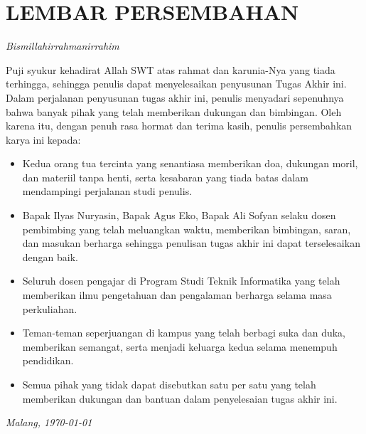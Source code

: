  {}
\chapter*{\uppercase{LEMBAR PERSEMBAHAN}}
\vspace{1cm}


\begin{center}
    \large\textit{Bismillahirrahmanirrahim}
\end{center}

\vspace{1cm}

Puji syukur kehadirat Allah SWT atas rahmat dan karunia-Nya yang tiada terhingga, sehingga penulis dapat menyelesaikan penyusunan Tugas Akhir ini. Dalam perjalanan penyusunan tugas akhir ini, penulis menyadari sepenuhnya bahwa banyak pihak yang telah memberikan dukungan dan bimbingan. Oleh karena itu, dengan penuh rasa hormat dan terima kasih, penulis persembahkan karya ini kepada:

\begin{itemize}
    \item Kedua orang tua tercinta yang senantiasa memberikan doa, dukungan moril, dan materiil tanpa henti, serta kesabaran yang tiada batas dalam mendampingi perjalanan studi penulis.

    \item Bapak Ilyas Nuryasin, Bapak Agus Eko, Bapak Ali Sofyan selaku dosen pembimbing yang telah meluangkan waktu, memberikan bimbingan, saran, dan masukan berharga sehingga penulisan tugas akhir ini dapat terselesaikan dengan baik.

    \item Seluruh dosen pengajar di Program Studi Teknik Informatika yang telah memberikan ilmu pengetahuan dan pengalaman berharga selama masa perkuliahan.

    \item Teman-teman seperjuangan di kampus yang telah berbagi suka dan duka, memberikan semangat, serta menjadi keluarga kedua selama menempuh pendidikan.

    \item Semua pihak yang tidak dapat disebutkan satu per satu yang telah memberikan dukungan dan bantuan dalam penyelesaian tugas akhir ini.
\end{itemize}

\vspace{1cm}
\begin{flushright}
    \textit{Malang, \today}
\end{flushright}

\newpage
